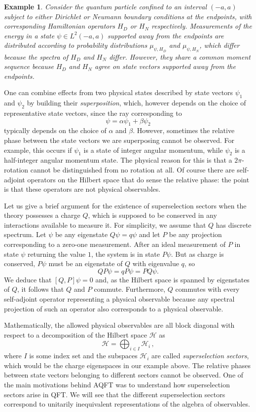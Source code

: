 \documentclass[12pt,a4paper]{article}
\newcommand{\1}{\mathds{1}}                         %
\newcommand{\Hcal}{\mathcal {H}}
\newtheorem{example}[theorem]{Example}
\begin{document}
\begin{example} 
Consider the quantum particle confined to an interval $(-a,a)$ subject to either Dirichlet or Neumann boundary conditions at the endpoints, with corresponding Hamiltonian operators $H_D$ or $H_N$ respectively. Measurements of the energy in a state $\psi\in L^2(-a,a)$ supported away from the endpoints are distributed according to probability distributions $\mu_{\psi,H_D}$ and $\mu_{\psi,H_N}$, which differ because the spectra of $H_D$ and $H_N$ differ. However, they share a common moment sequence because $H_D$ and $H_N$ agree on state vectors supported away from the endpoints.
\end{example}
 

One can combine effects from two physical states described by state vectors $\psi_1$ and $\psi_2$ by building their \textit{superposition}, which, however depends on the choice of representative state vectors, since the ray corresponding to 
\[
\psi=\alpha \psi_1+\beta\psi_2
\] 
typically depends on the choice of $\alpha$ and $\beta$. However, sometimes the relative phase between the state vectors we are superposing cannot be observed. For example, this occurs if $\psi_1$ is a state of integer angular momentum, while $\psi_2$ is a half-integer angular momentum state. The physical reason for this is that a $2\pi$-rotation cannot be distinguished from no rotation at all. Of course there are self-adjoint operators on the Hilbert space that do sense the relative phase: the point is that these operators are not physical observables. 

Let us give a brief argument for the existence of superselection sectors when the theory possesses a charge $Q$, which is supposed to be conserved in any interactions available to measure it. For simplicity, we assume that $Q$ has discrete spectrum. Let $\psi$ be any eigenstate $Q\psi=q\psi$ and let $P$ be any projection corresponding to a zero-one measurement. After an ideal measurement of $P$ in state $\psi$ returning the value $1$, the system is in state $P\psi$. But as charge is conserved, $P\psi$ must be an eigenstate of $Q$ with eigenvalue $q$, so
\[
QP\psi = q P\psi = PQ\psi.
\]
We deduce that $[Q,P]\psi=0$ and, as the Hilbert space is spanned by eigenstates of $Q$, it follows that $Q$ and $P$ commute. Furthermore, $Q$ commutes with every self-adjoint operator representing a physical observable because any spectral projection of such an operator also corresponds to a physical observable.  

Mathematically, the allowed physical observables are all block diagonal with respect to a 
decomposition of the Hilbert space $\Hcal$ as
\[
\Hcal=\bigoplus_{i\in I} \Hcal_i\,,
\]
where $I$ is some index set and the subspaces $\Hcal_i$ are called \textit{superselection sectors}, which would be the charge eigenspaces in our example above. The relative phases between state vectors belonging to different sectors cannot be observed. One of the main motivations behind AQFT was to understand how superselection sectors arise in QFT. We will see that the different superselection sectors correspond to unitarily inequivalent representations of the algebra of observables. 
\end{document}
